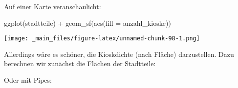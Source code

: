 \documentclass[11pt,german,a4paper]{article}
\newenvironment{Shaded}{\begin{snugshade}}{\end{snugshade}}
\newcommand{\AttributeTok}[1]{\textcolor[rgb]{0.77,0.63,0.00}{#1}}
\newcommand{\DecValTok}[1]{\textcolor[rgb]{0.00,0.00,0.81}{#1}}
\newcommand{\FunctionTok}[1]{\textcolor[rgb]{0.00,0.00,0.00}{#1}}
\newcommand{\NormalTok}[1]{#1}
\newcommand{\OtherTok}[1]{\textcolor[rgb]{0.56,0.35,0.01}{#1}}
\newcommand{\SpecialCharTok}[1]{\textcolor[rgb]{0.00,0.00,0.00}{#1}}
\begin{document}
Auf einer Karte veranschaulicht:

\begin{Shaded}
\begin{Highlighting}[]
\FunctionTok{ggplot}\NormalTok{(stadtteile) }\SpecialCharTok{+}
  \FunctionTok{geom\_sf}\NormalTok{(}\FunctionTok{aes}\NormalTok{(}\AttributeTok{fill =}\NormalTok{ anzahl\_kioske))}
\end{Highlighting}
\end{Shaded}

\texttt{[image: \_main\_files/figure-latex/unnamed-chunk-98-1.png]}

Allerdings wäre es schöner, die Kioskdichte (nach Fläche) darzustellen. Dazu berechnen wir zunächst die Flächen der Stadtteile:

\begin{Shaded}
\end{Shaded}

Oder mit Pipes:
\end{document}
